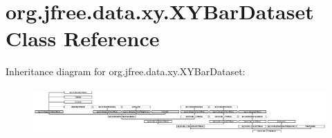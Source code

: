 \hypertarget{classorg_1_1jfree_1_1data_1_1xy_1_1_x_y_bar_dataset}{}\section{org.\+jfree.\+data.\+xy.\+X\+Y\+Bar\+Dataset Class Reference}
\label{classorg_1_1jfree_1_1data_1_1xy_1_1_x_y_bar_dataset}
Inheritance diagram for org.\+jfree.\+data.\+xy.\+X\+Y\+Bar\+Dataset\+:\begin{figure}[H]
\begin{center}
\leavevmode
\includegraphics[height=1.806452cm]{classorg_1_1jfree_1_1data_1_1xy_1_1_x_y_bar_dataset}
\end{center}
\end{figure}
